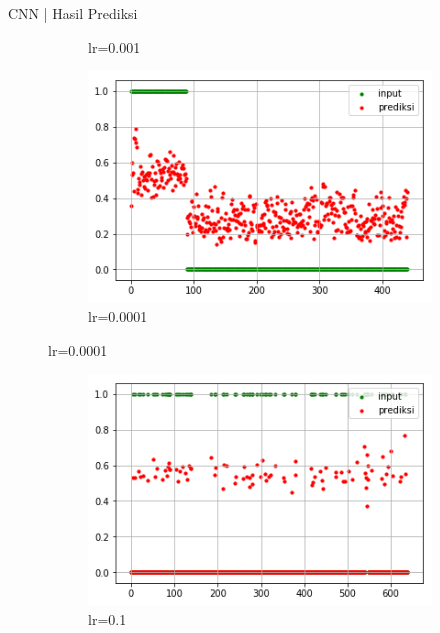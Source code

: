 \documentclass[t]{beamer}
\begin{document}
\begin{frame}{CNN | Hasil Prediksi}
\begin{figure}[H]
\begin{subfigure}[b]{.23\linewidth}
        \caption{lr=0.001}
    \end{subfigure}
    \begin{subfigure}[b]{.23\linewidth}
        \includegraphics[width=\textwidth]{public/assets/img/cnn_svchosta_train_pred00001.png}
        \caption{lr=0.0001}
    \end{subfigure}
\end{figure}
\begin{figure}[H]
    \begin{subfigure}[b]{.23\linewidth}
        \includegraphics[width=\textwidth]{public/assets/img/cnn_svchosta_test_pred01.png}
        \caption{lr=0.1}
    \end{subfigure}
    \begin{subfigure}[b]{.23\linewidth}

\end{subfigure}
\end{figure}
\end{frame}
\end{document}
